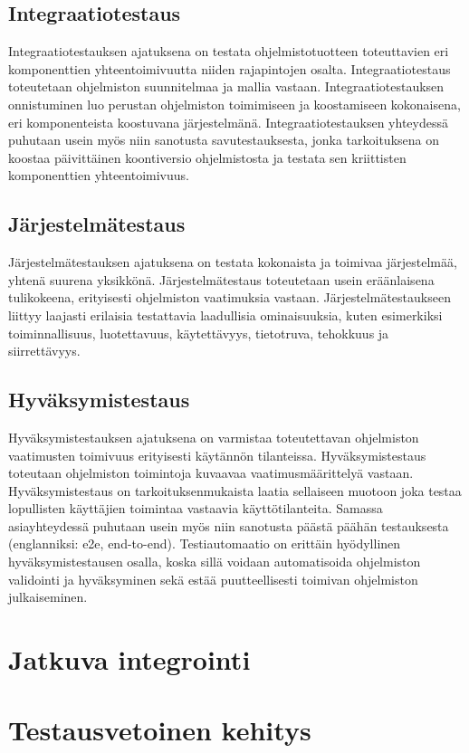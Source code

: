   \subsection{Integraatiotestaus} \label{07_integraatiotestaus}

  Integraatiotestauksen ajatuksena on testata ohjelmistotuotteen toteuttavien eri komponenttien yhteentoimivuutta niiden rajapintojen osalta.
  Integraatiotestaus toteutetaan ohjelmiston suunnitelmaa ja mallia vastaan.
  Integraatiotestauksen onnistuminen luo perustan ohjelmiston toimimiseen ja koostamiseen kokonaisena, eri komponenteista koostuvana järjestelmänä.
  Integraatiotestauksen yhteydessä puhutaan usein myös niin sanotusta savutestauksesta, jonka tarkoituksena on koostaa päivittäinen koontiversio ohjelmistosta ja testata sen kriittisten komponenttien yhteentoimivuus.

  \subsection{Järjestelmätestaus} \label{07_jarjestelmatestaus}

  Järjestelmätestauksen ajatuksena on testata kokonaista ja toimivaa järjestelmää, yhtenä suurena yksikkönä.
  Järjestelmätestaus toteutetaan usein eräänlaisena tulikokeena, erityisesti ohjelmiston vaatimuksia vastaan.
  Järjestelmätestaukseen liittyy laajasti erilaisia testattavia laadullisia ominaisuuksia, kuten esimerkiksi toiminnallisuus, luotettavuus, käytettävyys, tietotruva, tehokkuus ja siirrettävyys.

  \subsection{Hyväksymistestaus} \label{07_hyvaksymistestaus}

  Hyväksymistestauksen ajatuksena on varmistaa toteutettavan ohjelmiston vaatimusten toimivuus erityisesti käytännön tilanteissa.
  Hyväksymistestaus toteutaan ohjelmiston toimintoja kuvaavaa vaatimusmäärittelyä vastaan.
  Hyväksymistestaus on tarkoituksenmukaista laatia sellaiseen muotoon joka testaa lopullisten käyttäjien toimintaa vastaavia käyttötilanteita.
  Samassa asiayhteydessä puhutaan usein myös niin sanotusta päästä päähän testauksesta (englanniksi: e2e, end-to-end).
  Testiautomaatio on erittäin hyödyllinen hyväksymistestausen osalla, koska sillä voidaan automatisoida ohjelmiston validointi ja hyväksyminen sekä estää puutteellisesti toimivan ohjelmiston julkaiseminen.

\section{Jatkuva integrointi} \label{07_jatkuva_integrointi}


\section{Testausvetoinen kehitys} \label{07_testausvetoinen_kehitys}

